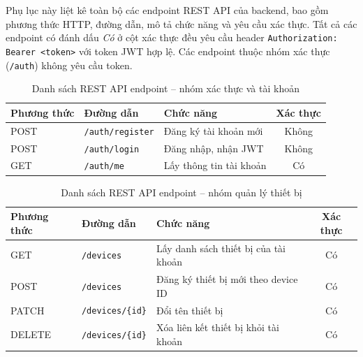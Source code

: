 \documentclass[../DoAn.tex]{subfiles}
\begin{document}
Phụ lục này liệt kê toàn bộ các endpoint REST API của backend, bao gồm phương thức HTTP, đường dẫn, mô tả chức năng và yêu cầu xác thực. Tất cả các endpoint có đánh dấu \textit{Có} ở cột xác thực đều yêu cầu header \texttt{Authorization: Bearer <token>} với token JWT hợp lệ. Các endpoint thuộc nhóm xác thực (\texttt{/auth}) không yêu cầu token.

\begin{table}[H]
\centering
\caption{Danh sách REST API endpoint -- nhóm xác thực và tài khoản}
\label{table:api_auth}
\begin{tabular}{|l|l|p{5.5cm}|c|}
\hline
\textbf{Phương thức} & \textbf{Đường dẫn} & \textbf{Chức năng} & \textbf{Xác thực} \\
\hline
POST & \texttt{/auth/register} & Đăng ký tài khoản mới & Không \\
\hline
POST & \texttt{/auth/login} & Đăng nhập, nhận JWT & Không \\
\hline
GET  & \texttt{/auth/me} & Lấy thông tin tài khoản & Có \\
\hline
\end{tabular}
\end{table}

\begin{table}[H]
\centering
\caption{Danh sách REST API endpoint -- nhóm quản lý thiết bị}
\label{table:api_device}
\begin{tabular}{|l|l|p{5.5cm}|c|}
\hline
\textbf{Phương thức} & \textbf{Đường dẫn} & \textbf{Chức năng} & \textbf{Xác thực} \\
\hline
GET    & \texttt{/devices} & Lấy danh sách thiết bị của tài khoản & Có \\
\hline
POST   & \texttt{/devices} & Đăng ký thiết bị mới theo device ID & Có \\
\hline
PATCH  & \texttt{/devices/\{id\}} & Đổi tên thiết bị & Có \\
\hline
DELETE & \texttt{/devices/\{id\}} & Xóa liên kết thiết bị khỏi tài khoản & Có \\
\hline
\end{tabular}
\end{table}
\end{document}
